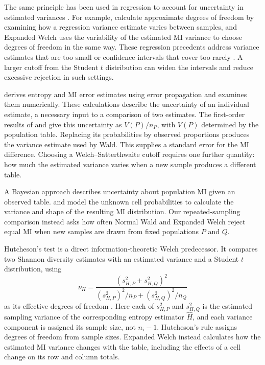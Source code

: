 The same principle has been used in regression to account for
uncertainty in estimated variances
\citep{panwall2002,bell2002,kauermann2001,fay2001,imbens2016}.
For example, \citet{panwall2002} calculate approximate degrees of freedom
by examining how a regression variance estimate varies between samples,
and Expanded Welch uses the variability of the estimated MI variance to choose
degrees of freedom in the same way.
These regression precedents address variance estimates that are too small
or confidence intervals that cover too rarely
\citep{bell2002,kauermann2001}. A larger cutoff from the Student \(t\)
distribution can widen the intervals and reduce excessive rejection in such
settings.

\medskip
{}

\citet{roulston1999} derives entropy and MI error estimates
using error propagation and examines them numerically. These calculations
describe the uncertainty of an individual estimate, a necessary input to a
comparison of two estimates.
The first-order results of \citet{moddemeijer1989} and
\citet{brillinger2004} give this uncertainty as \(V(P)/n_P\), with
\(V(P)\) determined by the population table. Replacing its probabilities
by observed proportions produces the variance estimate used by Wald.
This supplies a standard error for the MI difference. Choosing a
Welch--Satterthwaite cutoff requires one further quantity: how much the
estimated variance varies when a new sample produces a different table.

A Bayesian approach describes uncertainty about population MI given an
observed table. \citet{hutter2002} and \citet{hutterzaffalon2005} model the
unknown cell probabilities to calculate the variance and shape of the
resulting MI distribution. Our repeated-sampling comparison instead asks
how often Normal Wald and Expanded Welch reject equal MI when new samples
are drawn from fixed populations \(P\) and \(Q\).

Hutcheson's test is a direct information-theoretic Welch predecessor. It
compares two Shannon diversity estimates with an estimated variance and a
Student \(t\) distribution, using
\begin{equation}
  \nu_H=
  \frac{(s_{H,P}^2+s_{H,Q}^2)^2}
       {(s_{H,P}^2)^2/n_P+(s_{H,Q}^2)^2/n_Q}
  \label{eq:hutcheson-df}
\end{equation}
as its effective degrees of freedom \citep{hutcheson1970}. Here each of
\(s_{H,P}^2\) and \(s_{H,Q}^2\) is the estimated sampling variance of the
corresponding entropy estimator \(\widehat H\), and each variance component
is assigned its sample size, not \(n_i-1\).
Hutcheson's rule assigns degrees of freedom from sample sizes. Expanded
Welch instead calculates how the estimated MI variance changes with the
table, including the effects of a cell change on its row and column totals.

